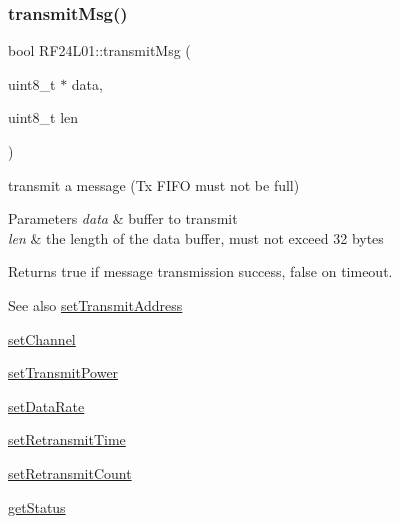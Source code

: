 \subsubsection{\texorpdfstring{transmit\+Msg()}{transmitMsg()}\hspace{0.1cm}{\footnotesize\ttfamily [2/2]}}
{\footnotesize\ttfamily bool R\+F24\+L01\+::transmit\+Msg (\begin{DoxyParamCaption}\item[{uint8\+\_\+t $\ast$}]{data,  }\item[{uint8\+\_\+t}]{len }\end{DoxyParamCaption})}

transmit a message (Tx F\+I\+FO must not be full) 
\begin{DoxyParams}{Parameters}
{\em data} & buffer to transmit \\
\hline
{\em len} & the length of the data buffer, must not exceed 32 bytes \\
\hline
\end{DoxyParams}
\begin{DoxyReturn}{Returns}
true if message transmission success, false on timeout. 
\end{DoxyReturn}
\begin{DoxySeeAlso}{See also}
\mbox{\hyperlink{namespace_r_f24_l01_a03d3bd840dfe193317329eb84c029685}{set\+Transmit\+Address}} 

\mbox{\hyperlink{namespace_r_f24_l01_ab75f49984cfbb8815145f85c3b8c2385}{set\+Channel}} 

\mbox{\hyperlink{namespace_r_f24_l01_a012e78392bee3ef90f145794be638eac}{set\+Transmit\+Power}} 

\mbox{\hyperlink{namespace_r_f24_l01_a79791c76ac83ff495c95d03db5d008b7}{set\+Data\+Rate}} 

\mbox{\hyperlink{namespace_r_f24_l01_a2eb287fa9de64ee6dbe173524a258f47}{set\+Retransmit\+Time}} 

\mbox{\hyperlink{namespace_r_f24_l01_a13376cc173b2063f033526e7930e3847}{set\+Retransmit\+Count}} 

\mbox{\hyperlink{namespace_r_f24_l01_a37ae626e05545579eee5d81c88601c30}{get\+Status}} 
\end{DoxySeeAlso}
